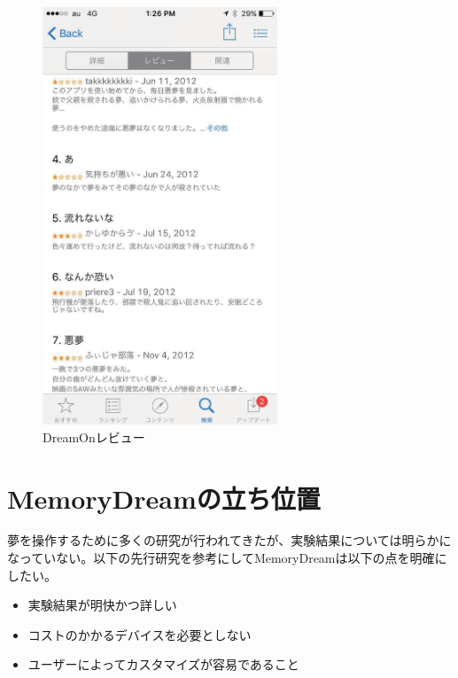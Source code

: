 \begin{figure}[htbp]
\begin{center}
\includegraphics[width=7cm]{eps/dreamOn.eps}
\caption{DreamOnレビュー}
\label{DreamOnレビュー}
\end{center}
\end{figure}

\section{MemoryDreamの立ち位置}
夢を操作するために多くの研究が行われてきたが、実験結果については明らかになっていない。以下の先行研究を参考にしてMemoryDreamは以下の点を明確にしたい。
\begin{itemize}
\item 実験結果が明快かつ詳しい
\item コストのかかるデバイスを必要としない
\item ユーザーによってカスタマイズが容易であること
\end{itemize}



